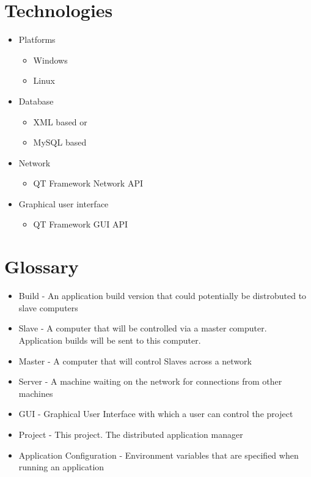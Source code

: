 \documentclass[a4paper,12pt,final]{article}
\begin{document}
\section{Technologies}

\begin{itemize}

\item{Platforms}
\begin{itemize}
\item{Windows}
\item{Linux}
\end{itemize}


\item{Database}
\begin{itemize}
\item{XML based or}
\item{MySQL based}
\end{itemize}


\item{Network}
\begin{itemize}
\item{QT Framework Network API}
\end{itemize}


\item{Graphical user interface}
\begin{itemize}
\item{QT Framework GUI API}
\end{itemize}

\end{itemize}


\section{Glossary}
\begin{itemize}
\item{Build - An application build version that could potentially be distrobuted to slave computers}
\item{Slave - A computer that will be controlled via a master computer. Application builds will be sent to this computer.}
\item{Master - A computer that will control Slaves across a network}
\item{Server - A machine waiting on the network for connections from other machines}
\item{GUI - Graphical User Interface with which a user can control the project}
\item{Project - This project. The distributed application manager}
\item{Application Configuration - Environment variables that are specified when running an application}
\end{itemize}
\end{document}
